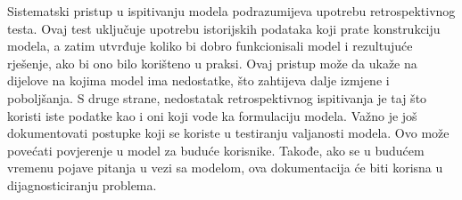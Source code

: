 \documentclass[a4paper, utf8, 11pt, colorlinks]{book}
\begin{document}
Sistematski pristup u ispitivanju modela podrazumijeva upotrebu retrospektivnog testa. Ovaj test uključuje upotrebu istorijskih podataka koji prate konstrukciju modela, a zatim utvrđuje koliko bi dobro funkcionisali model i rezultujuće rješenje, ako bi ono  bilo korišteno u praksi.  Ovaj pristup može da ukaže na dijelove na kojima model ima nedostatke, što zahtijeva dalje izmjene i poboljšanja. 
S druge strane, nedostatak retrospektivnog ispitivanja je taj što koristi iste podatke kao i oni koji vode ka formulaciju modela. %
Važno je još dokumentovati postupke koji se koriste u testiranju valjanosti modela. Ovo može  povećati povjerenje u model za buduće korisnike. Takođe, ako se u budućem vremenu pojave pitanja u vezi sa modelom, ova dokumentacija će  biti korisna u dijagnosticiranju problema. 

\end{document}
